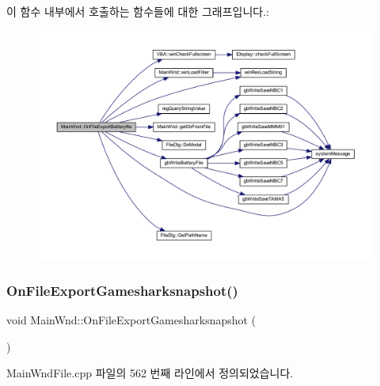 이 함수 내부에서 호출하는 함수들에 대한 그래프입니다.\+:
\nopagebreak
\begin{figure}[H]
\begin{center}
\leavevmode
\includegraphics[width=350pt]{class_main_wnd_a0da8957d2bcd55859914b0013c6d21f7_cgraph}
\end{center}
\end{figure}
\mbox{\label{class_main_wnd_ae567674cd79ab30eb420af2f91f5688c}} 
\subsubsection{\texorpdfstring{On\+File\+Export\+Gamesharksnapshot()}{OnFileExportGamesharksnapshot()}}
{\footnotesize\ttfamily void Main\+Wnd\+::\+On\+File\+Export\+Gamesharksnapshot (\begin{DoxyParamCaption}{ }\end{DoxyParamCaption})\hspace{0.3cm}{\ttfamily [protected]}}



Main\+Wnd\+File.\+cpp 파일의 562 번째 라인에서 정의되었습니다.



